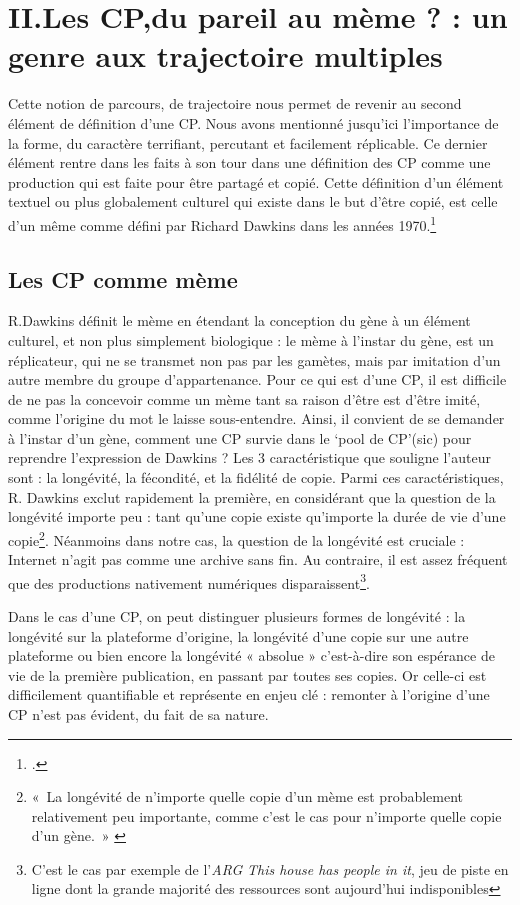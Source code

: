 \documentclass[12pt,a4paper,oneside,titlepage]{article} %
\begin{document}
\section*{II.Les CP,du pareil au mème ?  :  un genre aux trajectoire multiples}
	
	Cette notion de parcours, de trajectoire nous permet de revenir au second élément de définition d’une CP. Nous avons mentionné jusqu’ici l’importance de la forme, du caractère terrifiant, percutant et facilement réplicable. Ce dernier élément rentre dans les faits à son tour dans une définition des CP comme une production qui est faite pour être partagé et copié. Cette définition d’un élément textuel ou plus globalement culturel qui existe dans le but d’être copié, est celle d’un même comme défini par Richard Dawkins dans les années 1970.\footcite{dawkins_gene_2003}
	\subsection*{Les CP comme mème}
	R.Dawkins définit le mème en étendant la conception du gène à un élément culturel, et non plus simplement biologique : le mème à l’instar du gène, est un réplicateur, qui ne se transmet non pas par les gamètes, mais par imitation d’un autre membre du groupe d’appartenance. Pour ce qui est d’une CP, il est difficile de ne pas la concevoir comme un mème tant sa raison d’être est d’être imité, comme l’origine du mot le laisse sous-entendre. 
	Ainsi, il convient de se demander à l’instar d’un gène, comment une CP survie dans le ‘pool de CP’(sic) pour reprendre l’expression de Dawkins ? 
	Les 3 caractéristique que souligne l’auteur sont : la longévité, la fécondité, et la fidélité de copie. Parmi ces caractéristiques, R. Dawkins exclut rapidement la première, en considérant que la question de la longévité importe peu : tant qu’une copie existe qu’importe la durée de vie d’une copie\footnote{« La longévité de n’importe quelle copie d’un mème est probablement relativement peu importante, comme c’est le cas pour n’importe quelle copie d’un gène. » \cite[voir p.218]{dawkins_gene_2003}}. Néanmoins dans notre cas, la question de la longévité est cruciale : Internet n’agit pas comme une archive sans fin. Au contraire, il est assez fréquent que des productions nativement numériques disparaissent\footnote{C'est le cas par exemple de l'\emph{ARG} \emph{This house has people in it}, jeu de piste en ligne dont la grande majorité des ressources sont aujourd'hui indisponibles}. 
	
	Dans le cas d’une CP, on peut distinguer plusieurs formes de longévité : la longévité sur la plateforme d’origine, la longévité d’une copie sur une autre plateforme ou bien encore la longévité « absolue » c’est-à-dire son espérance de vie de la première publication, en passant par toutes ses copies. Or celle-ci est difficilement quantifiable et représente en enjeu clé : remonter à l’origine d’une CP n’est pas évident, du fait de sa nature.
\end{document}
